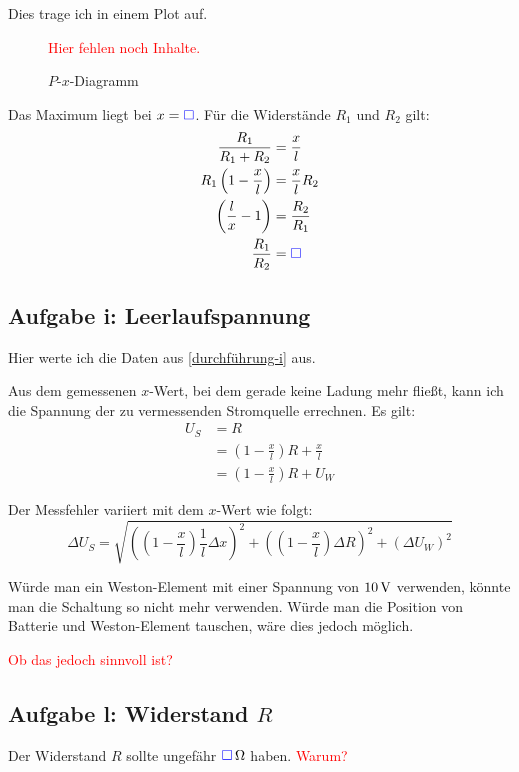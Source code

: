\documentclass[11pt,german]{article}
\newcommand{\messwert}{\textcolor{blue}{\square}}
\newcommand{\fehlt}{\textcolor{red}{Hier fehlen noch Inhalte.}}
\begin{document}
Dies trage ich in einem Plot auf.

\begin{figure}[h!]
	\centering
	\fehlt
	\caption{$P$-$x$-Diagramm}
\end{figure}

Das Maximum liegt bei $x = \messwert$. Für die Widerstände $R_1$ und $R_2$ gilt:
\begin{align*}
	\frac{R_1}{R_1 + R_2} &= \frac{x}{l} \\
	R_1 \left( 1 - \frac{x}{l} \right) &= \frac{x}{l} R_2 \\
		   \left( \frac{l}{x} - 1 \right) &= \frac{R_2}{R_1} \\
					\frac{R_1}{R_2} &= \messwert
\end{align*}

\subsection{Aufgabe i: Leerlaufspannung}

\label{auswertung-i}

Hier werte ich die Daten aus \ref{durchführung-i} aus.

Aus dem gemessenen $x$-Wert, bei dem gerade keine Ladung mehr fließt, kann ich die Spannung der zu vermessenden Stromquelle errechnen. Es gilt:
\begin{align*}
	U_S &= R \\
	&= \left( 1 - \frac xl \right) R + \frac xl \\
	&= \left( 1 - \frac xl \right) R + U_W
\end{align*}

Der Messfehler variiert mit dem $x$-Wert wie folgt:
\[
	\Delta U_S = \sqrt{
		\left( \left( 1 - \frac xl \right) \frac 1l \Delta x \right)^2
		+ \left( \left( 1 - \frac xl \right) \Delta R \right)^2
		+ \left( \Delta U_W \right)^2
	}
\]

Würde man ein Weston-Element mit einer Spannung von $\unit[10] V$ verwenden,
könnte man die Schaltung so nicht mehr verwenden. Würde man die Position von
Batterie und Weston-Element tauschen, wäre dies jedoch möglich.

\textcolor{red}{Ob das jedoch sinnvoll ist?}

\subsection{Aufgabe l: Widerstand $R$}

Der Widerstand $R$ sollte ungefähr $\unit[\messwert] \Omega$ haben. \textcolor{red}{Warum?}
\end{document}
